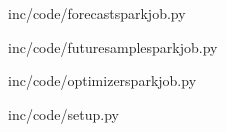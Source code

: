 
    {inc/code/forecastsparkjob.py}


    {inc/code/futuresamplesparkjob.py}


        {inc/code/optimizersparkjob.py}


            {inc/code/setup.py}